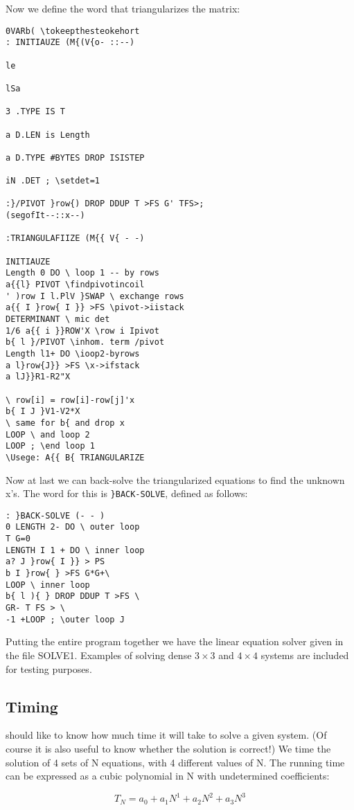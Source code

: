 Now we define the word that triangularizes the matrix:
\begin{verbatim}
0VARb( \tokeepthesteokehort
: INITIAUZE (M{(V{o- ::--)

le

lSa

3 .TYPE IS T

a D.LEN is Length

a D.TYPE #BYTES DROP ISISTEP

iN .DET ; \setdet=1

:}/PIVOT }row{) DROP DDUP T >FS G' TFS>;
(segofIt--::x--)

:TRIANGULAFIIZE (M{{ V{ - -)

INITIAUZE
Length 0 DO \ loop 1 -- by rows
a{{l} PIVOT \findpivotincoil
' )row I l.PlV }SWAP \ exchange rows
a{{ I }row{ I }} >FS \pivot->iistack
DETERMINANT \ mic det
1/6 a{{ i }}ROW'X \row i Ipivot
b{ l }/PIVOT \inhom. term /pivot
Length l1+ DO \ioop2-byrows
a l}row{J}} >FS \x->ifstack
a lJ}}R1-R2"X

\ row[i] = row[i]-row[j]'x
b{ I J }V1-V2*X
\ same for b{ and drop x
LOOP \ and loop 2
LOOP ; \end loop 1
\Usege: A{{ B{ TRIANGULARIZE
\end{verbatim}

Now at last we can back-solve the triangularized equations to find
the unknown x's. The word for this is \verb|}BACK-SOLVE|, defined
as follows:


\begin{verbatim}
: }BACK-SOLVE (- - )
0 LENGTH 2- DO \ outer loop
T G=0
LENGTH I 1 + DO \ inner loop
a? J }row{ I }} > PS
b I }row{ } >FS G*G+\
LOOP \ inner loop
b{ l ){ } DROP DDUP T >FS \
GR- T FS > \
-1 +LOOP ; \outer loop J
\end{verbatim} 

Putting the entire program together we have the linear equation
solver given in the file SOLVE1. Examples of solving dense $3\times 3$
and $4\times 4$ systems are included for testing purposes.

\subsection{Timing}
\TallC{We} should like to know how much time it will take to solve a 
given system. (Of course it is also useful to know whether the
solution is correct!) We time the solution of 4 sets of N equations,
with 4 different values of N. The running time can be expressed
as a cubic polynomial in N with undetermined coefficients:
\addtocounter{equation}{-3} %
\begin{equation}
	T_N=a_0+a_1N^1+a_2N^2+a_3N^3 \label{eq:09_19_}
\end{equation}

